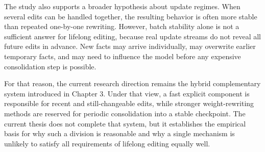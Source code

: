 The study also supports a broader hypothesis about update regimes. When several edits can be handled together, the resulting behavior is often more stable than repeated one-by-one rewriting. However, batch stability alone is not a sufficient answer for lifelong editing, because real update streams do not reveal all future edits in advance. New facts may arrive individually, may overwrite earlier temporary facts, and may need to influence the model before any expensive consolidation step is possible.

For that reason, the current research direction remains the hybrid complementary system introduced in Chapter 3. Under that view, a fast explicit component is responsible for recent and still-changeable edits, while stronger weight-rewriting methods are reserved for periodic consolidation into a stable checkpoint. The current thesis does not complete that system, but it establishes the empirical basis for why such a division is reasonable and why a single mechanism is unlikely to satisfy all requirements of lifelong editing equally well.

